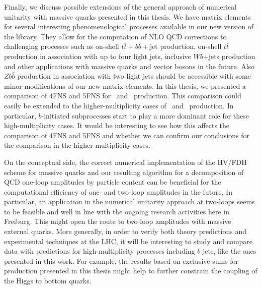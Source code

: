 Finally, we discuss possible extensions of the general approach of numerical unitarity with massive quarks presented in this thesis. We have matrix elements for several interesting phenomenological processes available in our new version of the
\BlackHat{} library. They allow for the computation of NLO QCD corrections to challenging processes such as on-shell
$t\bar{t}+b\bar{b}+$jet production, on-shell $t\bar{t}$
production in association with up to four light jets, inclusive $Wb$+jets production and other applications with massive quarks
and vector bosons in the future. Also $Zb\bar{b}$ production in association with two
light jets should be accessible with some minor modifications of our new
matrix elements. In this thesis, we presented a comparison of 4FNS and 5FNS for \Wbb~and \Wbbnj[1]~production. This comparison could easily be extended to the
higher-multiplicity cases of \Wbbnj[2]~and \Wbbnj[3]~production. In
particular, $b$-initiated subprocesses start to play a more
dominant role for these high-multiplicity cases. It would be interesting to see how this affects the comparison of 4FNS and 5FNS and whether we can confirm our conclusions for the comparison in the higher-multiplicity cases. 

On the conceptual side, the correct numerical implementation of the HV/FDH scheme for massive quarks and our resulting algorithm for a decomposition of QCD
one-loop amplitudes by particle content \cite{angerds} can be beneficial for the computational
efficiency of one- and two-loop amplitudes in the future. In particular, an
application in the numerical unitarity approach at two-loops seems to
be feasible and well in line with the ongoing research activities here
in Freiburg. This might open the route to two-loop amplitudes with massive external quarks. More generally, in order to verify both theory predictions and experimental
techniques at the LHC, it will be interesting to
study and compare data with predictions for high-multiplicity processes
including $b$ jets, like the ones presented in this work. For example, the results based on exclusive sums for \Wbb{} production presented in this thesis might help to further constrain the coupling of the Higgs to bottom quarks.


